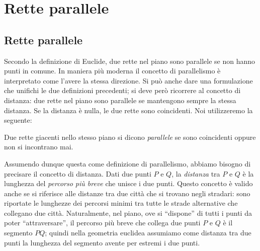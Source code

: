 
\chapter{Rette parallele}
\label{chap:rette_parallele}


\section{Rette parallele}\label{sect:rette_parallele}

Secondo la definizione di Euclide, due rette nel piano sono parallele 
se non hanno punti in comune.
In maniera più moderna il concetto di parallelismo è interpretato 
come l'avere la stessa direzione.
Si può anche dare una formulazione che unifichi le due definizioni 
precedenti; si deve però ricorrere al concetto di distanza: due rette 
nel piano sono parallele se mantengono sempre la stessa distanza. Se 
la distanza è nulla, le due rette sono coincidenti.
Noi utilizzeremo la seguente:
\begin{definizione}
  Due rette giacenti nello stesso piano si dicono \emph{parallele} se 
  sono coincidenti oppure non si incontrano mai.
\end{definizione}

Assumendo dunque questa come definizione di parallelismo, abbiamo 
bisogno di precisare il concetto di distanza.
Dati due punti $P$ e $Q$, la \emph{distanza} tra $P$ e $Q$ è la 
lunghezza del \emph{percorso più breve} che unisce i due punti. 
Questo concetto è valido anche se si riferisce alle distanze tra due 
città che si trovano negli stradari: sono riportate le lunghezze dei 
percorsi minimi tra tutte le strade alternative che collegano due 
città. Naturalmente, nel piano, ove si ``dispone'' di tutti i punti 
da poter ``attraversare'', il percorso più breve che collega due 
punti $P$ e $Q$ è il segmento $PQ$; quindi nella geometria euclidea 
assumiamo come distanza tra due punti la lunghezza del segmento 
avente per estremi i due punti.

